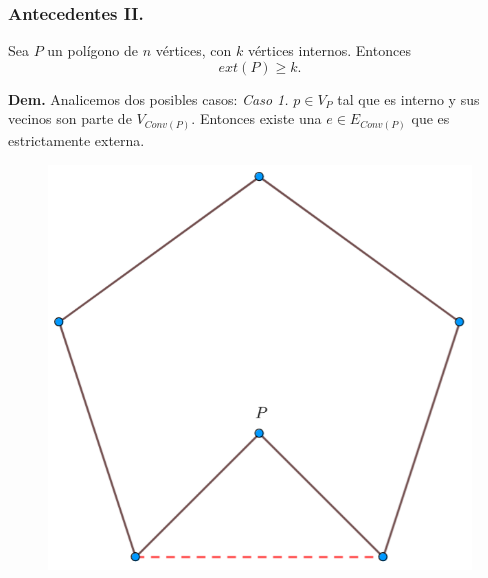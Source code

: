 \begin{frame}
  \frametitle{Antecedentes II.}    
  \begin{lema}
    Sea $P$ un polígono de $n$ vértices, con $k$ vértices internos. Entonces \[ext(P) \geq k.\]
  \end{lema}
  \textbf{Dem.} Analicemos dos posibles casos:\newline
  \textit{Caso 1.} $p \in V_P$ tal que es interno y sus vecinos son parte de $V_{Conv(P)}$. Entonces
  existe una $e \in E_{Conv(P)}$ que es estrictamente externa.
  \begin{figure}
    \centering
    \includegraphics[width=.15 \paperwidth]{./images/Caso01.png}
  \end{figure}
\end{frame}

